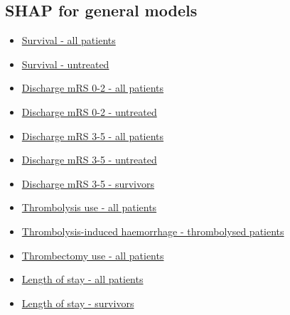 
\subsection{SHAP for general models}

\begin{itemize}
    \item \href{https://github.com/samuel-book/samuel-3/blob/main/3_machine_learning/3c_shap/01_shap_survival_all_patients.ipynb}{Survival - all patients}
    \item \href{https://github.com/samuel-book/samuel-3/blob/main/3_machine_learning/3c_shap/09_shap_survival_untreated_patients.ipynb}{Survival - untreated}
    \item \href{https://github.com/samuel-book/samuel-3/blob/main/3_machine_learning/3c_shap/02_shap_mrs_0_2_all_patients.ipynb}{Discharge mRS 0-2 - all patients}
    \item \href{https://github.com/samuel-book/samuel-3/blob/main/3_machine_learning/3c_shap/10_shap_mrs_0_2_untreated_patients.ipynb}{Discharge mRS 0-2 - untreated}
    \item \href{https://github.com/samuel-book/samuel-3/blob/main/3_machine_learning/3c_shap/03_shap_mrs_3_5_all_patients.ipynb}{Discharge mRS 3-5 - all patients}
    \item \href{https://github.com/samuel-book/samuel-3/blob/main/3_machine_learning/3c_shap/11_shap_mrs_3_5_untreated_patients.ipynb}{Discharge mRS 3-5 - untreated}
    \item \href{https://github.com/samuel-book/samuel-3/blob/main/3_machine_learning/3c_shap/04_shap_mrs_3_5_all_patients_survivers.ipynb}{Discharge mRS 3-5 - survivors}
    \item \href{https://github.com/samuel-book/samuel-3/blob/main/3_machine_learning/3c_shap/05_thrombolysis_use_all_patients.ipynb}{Thrombolysis use - all patients}
    \item \href{https://github.com/samuel-book/samuel-3/blob/main/3_machine_learning/3c_shap/07_thrombolysis_induced_haemorrhages.ipynb}{Thrombolysis-induced haemorrhage - thrombolysed patients}
    \item \href{https://github.com/samuel-book/samuel-3/blob/main/3_machine_learning/3c_shap/06_thrombectomy_use_all_patients.ipynb}{Thrombectomy use - all patients}
    \item \href{https://github.com/samuel-book/samuel-3/blob/main/3_machine_learning/3c_shap/08_shap_los_all_patients.ipynb}{Length of stay - all patients}
    \item \href{https://github.com/samuel-book/samuel-3/blob/main/3_machine_learning/3c_shap/12_shap_los_surviving_patients.ipynb}{Length of stay - survivors}
\end{itemize}